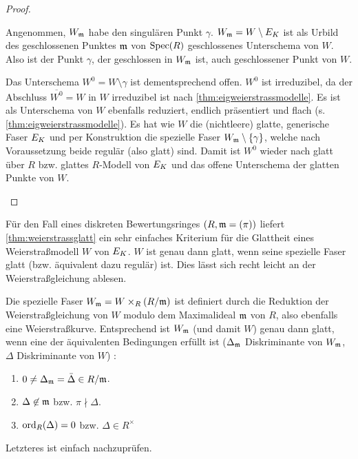 \begin{Lemma}
\begin{proof}
\begin{enumerate}[label=(\alph*)]
      Angenommen, $W_{\mathfrak{m}}$ habe den singulären Punkt $\gamma$.
      $W_{\mathfrak{m}}=W\setminus E_{K}$ ist als Urbild des geschlossenen Punktes
      $\mathfrak{m}$ von $\operatorname{Spec}(R)$ geschlossenes Unterschema von $W$.
      Also ist der Punkt $\gamma$, der geschlossen in $W_{\mathfrak{m}}$ ist, auch
      geschlossener Punkt von $W$.
      
      Das Unterschema $W^0=W\setminus\gamma$ ist dementsprechend offen.
      $W^0$ ist irreduzibel, da der Abschluss $\overline{W^0}=W$ in
      $W$ irreduzibel ist nach \ref{thm:eigweierstrassmodelle}.
      Es ist als Unterschema von $W$ ebenfalls reduziert, endlich
      präsentiert und flach (s. \ref{thm:eigweierstrassmodelle}).
      Es hat wie $W$ die (nichtleere) glatte, generische Faser $E_{K}$ und
      per Konstruktion die spezielle Faser $W_{\mathfrak{m}}\setminus\{\gamma\}$,
      welche nach Voraussetzung beide regulär (also glatt) sind.
      Damit ist $W^0$ wieder nach \cite[8.5, Proposition 17]{bosch}
      glatt über $R$ bzw. glattes $R$-Modell von $E_{K}$ und das offene
      Unterschema der glatten Punkte von $W$.
    \end{enumerate}
  \end{proof}
\end{Lemma}

\begin{Bemerkung}\label{thm:weierstraßmodellglatt}
  Für den Fall eines diskreten Bewertungsringes $(R,\mathfrak{m}=(\pi))$ liefert
  \ref{thm:weierstrassglatt} ein sehr einfaches Kriterium für die
  Glattheit eines Weierstraßmodell $W$ von $E_{K}$.
  $W$ ist genau dann glatt, wenn seine spezielle Faser glatt
  (bzw. äquivalent dazu regulär) ist.
  Dies lässt sich recht leicht an der Weierstraßgleichung ablesen.
  
  Die spezielle Faser $W_{\mathfrak{m}}=W\times_R (R/\mathfrak{m})$ ist definiert
  durch die Reduktion der Weierstraßgleichung von $W$ modulo dem
  Maximalideal $\mathfrak{m}$ von $R$, also ebenfalls eine Weierstraßkurve.
  Entsprechend ist $W_{\mathfrak{m}}$ (und damit $W$) genau dann glatt, wenn
  eine der äquivalenten Bedingungen erfüllt ist
  ($\Delta_{\mathfrak{m}}$ Diskriminante von $W_{\mathfrak{m}}$,
  $\Delta$ Diskriminante von $W$)
  \cite[Proposition VII.5.1 (a)]{silverman}:
  \begin{enumerate}[label=(\roman*)]
  \item $0\neq\Delta_{\mathfrak{m}}=\bar\Delta\in R/\mathfrak{m}$.
  \item $\Delta\not\in\mathfrak{m}$ bzw. $\pi\nmid\Delta$.
  \item $\operatorname{ord}_R(\Delta)=0$ bzw. $\Delta\in R^\times$
  \end{enumerate}
  Letzteres ist einfach nachzuprüfen.
\end{Bemerkung}

